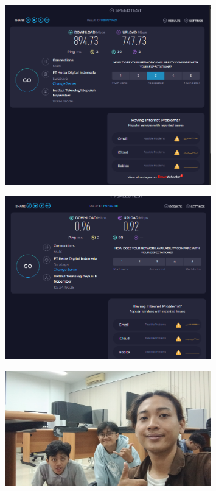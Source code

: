 \begin{figure}[H]

\centering
\includegraphics[width=0.8\textwidth]{P1/img/Screenshot 2025-06-05 191624.png}
\end{figure}

\begin{figure}[H]

\centering
\includegraphics[width=0.8\textwidth]{P1/img/Screenshot 2025-06-05 191803.png}
\end{figure}

\begin{figure}[H]
\centering
\includegraphics[width=0.8\textwidth]{P1/img/image.png}
\end{figure}



